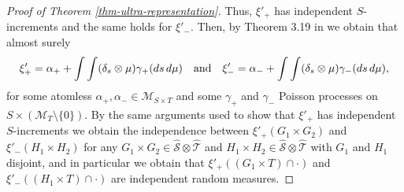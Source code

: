 \documentclass{article}
\theoremstyle{plain}
\theoremstyle{remark}
\begin{document}
\begin{proof}[Proof of Theorem \ref{thm-ultra-representation}]
	Thus, $\xi'_+$ has independent $S$-increments and the same holds for $\xi'_-$. Then, by Theorem 3.19 in \cite{Kallenberg2} we obtain that almost surely
	\begin{equation*}
		\xi'_+=\alpha_++\int\int (\delta_s\otimes\mu)\gamma_+(ds\,d\mu)\quad\textnormal{and}\quad \xi'_-=\alpha_-+\int\int (\delta_s\otimes\mu)\gamma_-(ds\,d\mu),
	\end{equation*}
	for some atomless $\alpha_+,\alpha_-\in\mathcal{M}_{S\times T}$ and some $\gamma_+$ and $\gamma_-$ Poisson processes on $S\times(\mathcal{M}_T\setminus\{0\})$. By the same arguments used to show that $\xi'_+$ has independent $S$-increments we obtain the independence between $\xi'_+(G_1\times G_2)$ and $\xi'_-(H_1\times H_2)$ for any $G_1\times G_2\in\hat{\mathcal{S}}\otimes\hat{\mathcal{T}}$ and $H_1\times H_2\in\hat{\mathcal{S}}\otimes\hat{\mathcal{T}}$ with $G_1$ and $H_1$ disjoint, and in particular we obtain that  $\xi'_+((G_1\times T)\cap \cdot)$ and $\xi'_-((H_1\times T)\cap\cdot)$ are independent random measures.
	

\end{proof}
\end{document}
